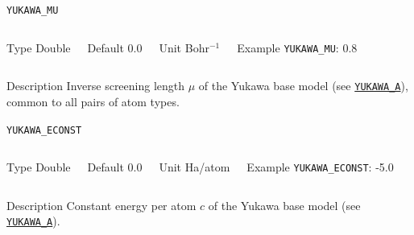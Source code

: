 \begin{frame}[allowframebreaks]{\texttt{{YUKAWA\_MU}}} \label{YUKAWA_MU}
\vspace*{-12pt}
\begin{columns}
\begin{block}{Type}
Double
\end{block}

\begin{block}{Default}
0.0
\end{block}

\begin{block}{Unit}
Bohr$^{-1}$
\end{block}

\begin{block}{Example}
\texttt{YUKAWA\_MU}: 0.8
\end{block}
\end{columns}

\begin{block}{Description}
Inverse screening length $\mu$ of the Yukawa base model (see \hyperlink{YUKAWA_A}{\texttt{YUKAWA\_A}}), common to all pairs of atom types.
\end{block}

\end{frame}

\begin{frame}[allowframebreaks]{\texttt{{YUKAWA\_ECONST}}} \label{YUKAWA_ECONST}
\vspace*{-12pt}
\begin{columns}
\begin{block}{Type}
Double
\end{block}

\begin{block}{Default}
0.0
\end{block}

\begin{block}{Unit}
Ha/atom
\end{block}

\begin{block}{Example}
\texttt{YUKAWA\_ECONST}: -5.0
\end{block}
\end{columns}

\begin{block}{Description}
Constant energy per atom $c$ of the Yukawa base model (see \hyperlink{YUKAWA_A}{\texttt{YUKAWA\_A}}).
\end{block}

\end{frame}

